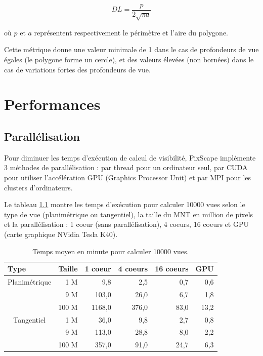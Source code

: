 \documentclass{report}
\begin{document}
$$DL=\frac{p}{2\sqrt{\pi a}}$$

où $p$ et $a$ représentent respectivement le périmètre et l’aire du polygone. 

Cette métrique donne une valeur minimale de 1 dans le cas de profondeurs de vue égales (le polygone forme un cercle), et des valeurs élevées (non bornées) dans le cas de variations fortes des profondeurs de vue.


\chapter{Performances}
\label{perf}

\section{Parallélisation}
\label{parallelism}
Pour diminuer les temps d'exécution de calcul de visibilité, PixScape implémente 3 méthodes de parallélisation : par thread pour un ordinateur seul, par CUDA pour utiliser l'accélération GPU (Graphics Processor Unit) et par MPI pour les clusters d'ordinateurs.

Le tableau \ref{perf_table} montre les temps d'exécution pour calculer 10000 vues selon le type de vue (planimétrique ou tangentiel), la taille du MNT en million de pixels et la parallélisation : 1 coeur (sans parallélisation), 4 coeurs, 16 coeurs et GPU (carte graphique NVidia Tesla K40).

\begin{table}[htbp]
	
	\begin{tabular}{|l|r|r|r|r|r|}
		\hline
		Type & \multicolumn{1}{l|}{Taille} & \multicolumn{1}{l|}{1 coeur} & \multicolumn{1}{l|}{4 coeurs} & \multicolumn{1}{l|}{16 coeurs} & \multicolumn{1}{l|}{GPU} \\ \hline
		\multicolumn{ 1}{|c|}{Planimétrique} & 1 M & 9,8 & 2,5 & 0,7 & 0,6 \\ \cline{ 2- 6}
		\multicolumn{ 1}{|l|}{} & 9 M & 103,0 & 26,0 & 6,7 & 1,8 \\ \cline{ 2- 6}
		\multicolumn{ 1}{|l|}{} & 100 M & 1168,0 & 376,0 & 83,0 & 13,2 \\ \hline
		\multicolumn{ 1}{|c|}{Tangentiel} & 1 M & 36,0 & 9,8 & 2,7 & 0,8 \\ \cline{ 2- 6}
		\multicolumn{ 1}{|l|}{} & 9 M & 113,0 & 28,8 & 8,0 & 2,2 \\ \cline{ 2- 6}
		\multicolumn{ 1}{|l|}{} & 100 M & 357,0 & 91,0 & 24,7 & 6,3 \\ \hline
	\end{tabular}
	\caption{Temps moyen en minute pour calculer 10000 vues.}
	\label{perf_table}
\end{table}
\end{document}
